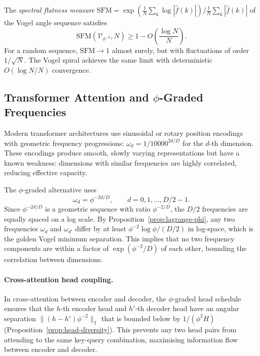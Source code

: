 \begin{proposition}
\label{prop:spectral-flat}
The \emph{spectral flatness measure}
$\mathrm{SFM} = \exp\left(\frac{1}{N}\sum_{k}\log|\hat{f}(k)|\right) /
               \frac{1}{N}\sum_k|\hat{f}(k)|$
of the Vogel angle sequence satisfies
\[
  \mathrm{SFM}(\mathcal{V}_{\phi^{-2}}, N) \geq 1 - O\!\left(\frac{\log N}{N}\right).
\]
For a random sequence, $\mathrm{SFM} \to 1$ almost surely, but with
fluctuations of order $1/\sqrt{N}$.  The Vogel spiral achieves the
same limit with deterministic $O(\log N / N)$ convergence.
\end{proposition}

\subsection{Transformer Attention and $\phi$-Graded Frequencies}
\label{subsec:transformer-phi}

Modern transformer architectures use sinusoidal or rotary position
encodings with geometric frequency progressions:
$\omega_d = 1/10000^{2d/D}$ for the $d$-th dimension.  These encodings
produce smooth, slowly varying representations but have a known
weakness: dimensions with similar frequencies are highly correlated,
reducing effective capacity.

The $\phi$-graded alternative uses
\[
  \omega_d = \phi^{-2d/D}, \qquad d = 0, 1, \ldots, D/2 - 1.
\]
Since $\phi^{-2d/D}$ is a geometric sequence with ratio $\phi^{-2/D}$,
the $D/2$ frequencies are equally spaced on a log scale.  By
Proposition~\ref{prop:lagrange-phi}, any two frequencies $\omega_d$
and $\omega_{d'}$ differ by at least $\phi^{-2}\log\phi/(D/2)$ in
log-space, which is the golden Vogel minimum separation.  This implies
that no two frequency components are within a factor of
$\exp(\phi^{-2}/D)$ of each other, bounding the correlation between
dimensions.

\paragraph{Cross-attention head coupling.}
In cross-attention between encoder and decoder, the $\phi$-graded head
schedule ensures that the $h$-th encoder head and $h'$-th decoder head
have an angular separation $\|(h-h')\phi^{-2}\|_{\mathbb{T}}$ that is
bounded below by $1/(\phi^2 H)$ (Proposition~\ref{prop:head-diversity}).
This prevents any two head pairs from attending to the same key-query
combination, maximising information flow between encoder and decoder.

